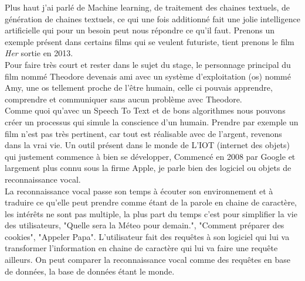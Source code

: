Plus haut j'ai parlé de Machine learning, de traitement des chaines textuels, de génération de chaines textuels, ce qui une fois additionné fait une jolie intelligence artificielle qui pour un besoin peut nous répondre ce qu'il faut. Prenons un exemple présent dans certains films qui se veulent futuriste, tient prenons le film \textit{Her} sortie en 2013.\\
\linebreak
Pour faire très court et rester dans le sujet du stage, le personnage principal du film nommé Theodore devenais ami avec un système d'exploitation (os) nommé Amy, une os tellement proche de l'être humain, celle ci pouvais apprendre, comprendre et communiquer sans aucun problème avec Theodore.\\
Comme quoi qu'avec un Speech To Text et de bons algorithmes nous pouvons créer un processus qui simule la conscience d'un humain. Prendre par exemple un film n'est pas très pertinent, car tout est réalisable avec de l'argent, revenons dans la vrai vie. Un outil présent dans le monde de L'IOT (internet des objets) qui justement commence à bien se développer, Commencé en 2008 par Google et largement plus connu sous la firme Apple, je parle bien des logiciel ou objets de reconnaissance vocal.\\
\linebreak
La reconnaissance vocal passe son temps à écouter son environnement et à traduire ce qu'elle peut prendre comme étant de la parole en chaine de caractère, les intérêts ne sont pas multiple, la plus part du temps c'est pour simplifier la vie des utilisateurs, "Quelle sera la Méteo pour demain.", "Comment préparer des cookies", "Appeler Papa". L'utilisateur fait des requêtes à son logiciel qui lui va transformer l'information en chaine de caractère qui lui va faire une requête ailleurs. On peut comparer la reconnaissance vocal comme des requêtes en base de données, la base de données étant le monde.\\
\pagebreak


